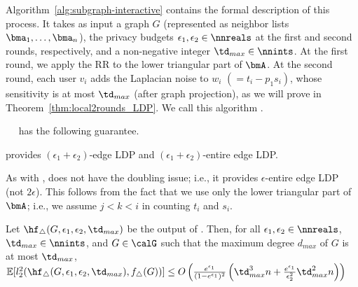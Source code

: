 Algorithm~\ref{alg:subgraph-interactive} contains the formal
description of this process. 
It takes as input a graph $G$ (represented as neighbor lists $\bma_1, \ldots, \bma_n$), the privacy budgets $\epsilon_1, \epsilon_2 \in \nnreals$ at the first and second rounds, respectively, 
and 
a non-negative integer $\td_{max} \in \nnints$. 
At the first round, we apply the RR to the lower triangular part of $\bmA$. 
At the second round, each user $v_i$ adds the Laplacian noise to $w_i$ $(= t_i - p_1 s _i)$, whose 
sensitivity is at most 
$\td_{max}$ (after graph projection), 
as we will prove in Theorem~\ref{thm:local2rounds_LDP}. 
We call this algorithm .


\smallskip
{}~~ 
has the following 
guarantee.

\begin{theorem}\label{thm:local2rounds_LDP}
  provides $(\epsilon_1 + \epsilon_2)$-edge LDP and $(\epsilon_1 + \epsilon_2)$-entire edge LDP.
\end{theorem}

As with ,  does not have the doubling issue; i.e., it provides $\epsilon$-entire edge LDP (not $2\epsilon$). 
This follows from the fact that we 
use only the lower triangular part of $\bmA$; 
i.e., we assume 
$j<k<i$ 
in counting $t_i$ and $s_i$. 

\begin{theorem}\label{thm:local2rounds}
  Let 
  $\hf_{\triangle}(G, \epsilon_1, \epsilon_2, \td_{max})$ 
  be the output of 
  . 
  Then, for all 
  $\epsilon_1,\epsilon_2 \in \nnreals$, 
  $\td_{max} \in \nnints$,
  and $G\in \calG$ such that the
  maximum degree $d_{max}$ of $G$ is 
  at most 
  $\td_{max}$,
  $\mathbb{E}[l_2^2(\hf_{\triangle}(G, \epsilon_1, \epsilon_2, \td_{max}), f_\triangle(G))] 
  \leq
    O\left(\frac{e^{\epsilon_1}}{(1-e^{\epsilon_1})^2} \left(\td_{max}^3 n +
    \frac{e^{\epsilon_1}}{\epsilon_2^2}\td_{max}^2 n\right)\right)$
\end{theorem}

